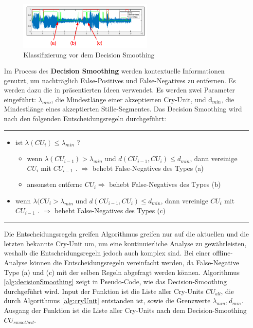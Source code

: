 \begin{figure}[h]
	\centering
	\includegraphics[width=0.6\textwidth]{bilder/smoothing02.png}
	\caption{Klassifizierung vor dem Decision Smoothing}
	\label{img:beforeSmoothing}
\end{figure}

Im Process des \textbf{Decision Smoothing} werden kontextuelle Informationen genutzt, um nachträglich False-Positives und False-Negatives zu entfernen. Es werden dazu die in \cite{vad_entropy} präsentierten Ideen verwendet. Es werden zwei Parameter eingeführt: $\lambda_{min}$, die Mindestlänge einer akzeptierten Cry-Unit, und d$_{min}$, die Mindestlänge eines akzeptierten Stille-Segmentes. Das Decision Smoothing wird nach den folgenden Entscheidungsregeln durchgeführt:

\noindent\rule{\linewidth}{0.3pt}
\begin{itemize}
	\item ist $\lambda (CU_{i}) \leq \lambda_{min}$ ?
	\begin{itemize}
		\item wenn $\lambda (CU_{i-1}) > \lambda_{min}$ und $d (CU_{i-1}, CU_{i}) \leq d_{min}$, dann vereinige $CU_{i}$ mit $CU_{i-1}$ . $\Rightarrow$ behebt False-Negatives des Types (a)
		\item ansonsten entferne $CU_i \Rightarrow$ behebt False-Negatives des Types (b)
	\end{itemize}
	\item wenn $\lambda (CU_{i} > \lambda_{min}$ und $d (CU_{i-1}, CU_{i}) \leq d_{min}$, dann vereinige $CU_{i}$ mit $CU_{i-1}$ . $\Rightarrow$ behebt False-Negatives des Types (c)
\end{itemize}
\noindent\rule{\linewidth}{0.3pt}

Die Entscheidungsregeln greifen Algorithmus greifen nur auf die aktuellen und die letzten bekannte Cry-Unit um, um eine kontinuierliche Analyse zu gewährleisten, weshalb die Entscheidungsregeln jedoch auch komplex sind. Bei einer offline-Analyse können die Entscheidungsregeln vereinfacht werden, da False-Negative Type (a) und (c) mit der selben Regeln abgefragt werden können. Algorithmus \ref{alg:decisionSmoothing} zeigt in Pseudo-Code, wie das Decision-Smoothing durchgeführt wird. Input der Funktion ist die Liste aller Cry-Units $CU_{all}$, die durch Algorithmus \ref{alg:cryUnit} entstanden ist, sowie die Grenzwerte $\lambda_{min}, d_{min}$. Ausgang der Funktion ist die Liste aller Cry-Units nach dem Decision-Smoothing $CU_{smoothed}$.

